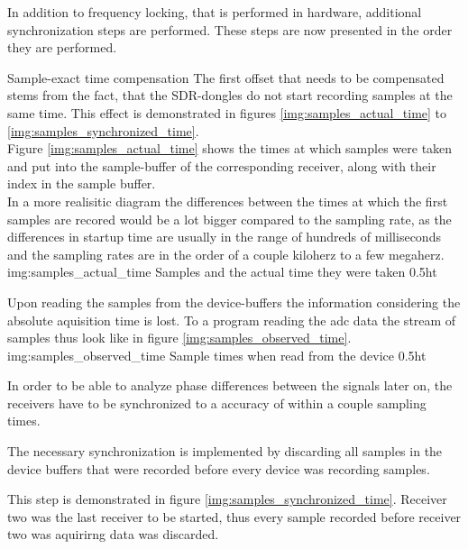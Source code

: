 In addition to frequency locking, that is performed in
hardware, additional synchronization steps are
performed. These steps are now presented in the
order they are performed. \\

\begin{subchapter}{Sample-exact time compensation}
  The first offset that needs to be compensated stems
  from the fact, that the SDR-dongles do not start
  recording samples at the same time.
  This effect is demonstrated in figures
  \ref{img:samples_actual_time} to \ref{img:samples_synchronized_time}. \\

  Figure \ref{img:samples_actual_time} shows the
  times at which samples were taken and put into the
  sample-buffer of the corresponding receiver, along
  with their index in the sample buffer.  \\

  In a more realisitic diagram the differences between the
  times at which the first samples are recored would be
  a lot bigger compared to the sampling rate, as the
  differences in startup time are usually in the range
  of hundreds of milliseconds and the sampling rates are
  in the order of a couple kiloherz to a few megaherz. \\

               {img:samples_actual_time}
               {Samples and the actual time they were taken}
               {0.5}{ht}

  Upon reading the samples from the device-buffers
  the information considering the absolute aquisition time is
  lost. To a program reading the \acrshort{adc} data the
  stream of samples thus look like in figure \ref{img:samples_observed_time}. \\

               {img:samples_observed_time}
               {Sample times when read from the device}
               {0.5}{ht}

  In order to be able to analyze phase differences between
  the signals later on, the receivers have to be synchronized to
  a accuracy of within a couple sampling times.

  The necessary synchronization is implemented by discarding
  all samples in the device buffers that were recorded
  before every device was recording samples.

  This step is demonstrated in figure \ref{img:samples_synchronized_time}.
  Receiver two was the last receiver to be started,
  thus every sample recorded before receiver two was aquirirng
  data was discarded.


\end{subchapter}
